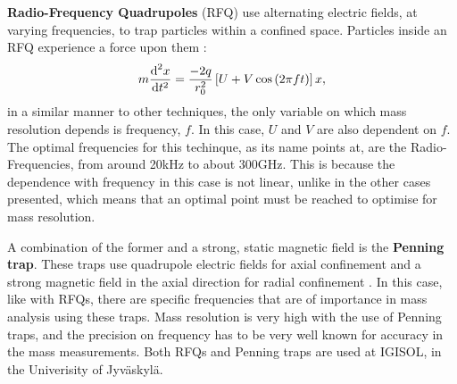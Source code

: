 \textbf{Radio-Frequency Quadrupoles} (RFQ) use alternating electric fields, at varying frequencies, to trap particles within a confined space. Particles inside an RFQ experience a force upon them \cite{traps}:
\begin{equation}
    \label{eq:rfq}
    m \frac{\text{d}^2 x}{\text{d} t^2} = \frac{-2q}{r_0^2}\left[U + V\cos{\left(2\pi f t\right)}\right]x,
\end{equation} 
in a similar manner to other techniques, the only variable on which mass resolution depends is frequency, $f$. In this case, $U$ and $V$ are also dependent on $f$. The optimal frequencies for this techinque, as its name points at, are the Radio-Frequencies, from around 20\unit{kHz} to about 300\unit{GHz}. This is because the dependence with frequency in this case is not linear, unlike in the other cases presented, which means that an optimal point must be reached to optimise for mass resolution.

A combination of the former and a strong, static magnetic field is the \textbf{Penning trap}. These traps use quadrupole electric fields for axial confinement and a strong magnetic field in the axial direction for radial confinement \cite{penning}. In this case, like with RFQs, there are specific frequencies that are of importance in mass analysis using these traps. Mass resolution is very high with the use of Penning traps, and the precision on frequency has to be very well known for accuracy in the mass measurements. Both RFQs and Penning traps are used at IGISOL, in the Univerisity of Jyväskylä.
